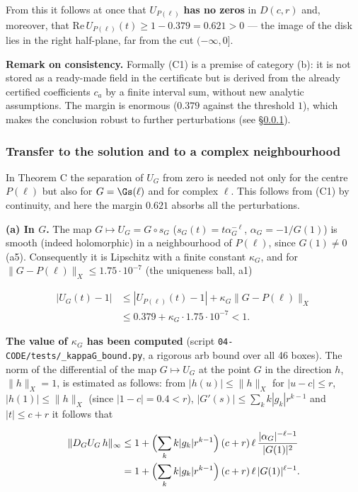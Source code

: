 From this it follows at once that $U_{P(\ell)}$ \textbf{has no zeros} in
$D(c,r)$ and, moreover, that $\mathrm{Re}\,U_{P(\ell)}(t)\ge 1-0.379=0.621>0$
--- the image of the disk lies in the right half-plane, far from the cut
$(-\infty,0]$.

\textbf{Remark on consistency.} Formally (C1) is a premise of category (b):
it is not stored as a ready-made field in the certificate but is derived from
the already certified coefficients $c_a$ by a finite interval sum, without
new analytic assumptions. The margin is enormous ($0.379$ against the
threshold $1$), which makes the conclusion robust to further perturbations
(see \S\ref{sec:6.4.3}).

\subsubsection{Transfer to the solution and to a complex neighbourhood}
\label{sec:6.4.3}

In Theorem C the separation of $U_G$ from zero is needed not only for the
centre $P(\ell)$ but also for $G=\Gs(\ell)$ and for complex $\ell$. This
follows from (C1) by continuity, and here the margin $0.621$ absorbs all the
perturbations.

\textbf{(a) In $G$.} The map $G\mapsto U_G=G\circ s_G$
($s_G(t)=t\alpha_G^{-\ell}$, $\alpha_G=-1/G(1)$) is smooth (indeed
holomorphic) in a neighbourhood of $P(\ell)$, since $G(1)\neq0$ (a5).
Consequently it is Lipschitz with a finite constant $\kappa_G$, and for
$\|G-P(\ell)\|_X\le1.75\cdot10^{-7}$ (the uniqueness ball, a1)

\begin{align*}
|U_G(t)-1|&\le|U_{P(\ell)}(t)-1|+\kappa_G\|G-P(\ell)\|_X\\
&\le0.379+\kappa_G\cdot1.75\cdot10^{-7}<1.
\end{align*}

\textbf{The value of $\kappa_G$ has been computed} (script
\texttt{04-\allowbreak CODE/\allowbreak tests/\allowbreak \_\allowbreak kappaG\_\allowbreak bound.py}, a rigorous arb bound over all 46
boxes). The norm of the differential of the map $G\mapsto U_G$ at the point
$G$ in the direction $h$, $\|h\|_X=1$, is estimated as follows: from
$|h(u)|\le\|h\|_X$ for $|u-c|\le r$, $|h(1)|\le\|h\|_X$ (since
$|1-c|=0.4<r$), $|G'(s)|\le\sum_k k|g_k|r^{k-1}$ and $|t|\le c+r$ it follows
that

\begin{align*}
\|D_GU_G\,h\|_\infty&\le 1+\Bigl(\sum_k k|g_k|r^{k-1}\Bigr)\,(c+r)\,\ell\,
\frac{|\alpha_G|^{-\ell-1}}{|G(1)|^{2}}\\
&= 1+\Bigl(\sum_k k|g_k|r^{k-1}\Bigr)\,(c+r)\,\ell\,|G(1)|^{\ell-1}.
\end{align*}

